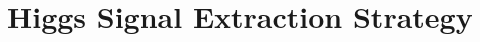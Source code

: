 \documentclass{cmspaper}
\begin{document}
\clearpage    
\section{Higgs Signal Extraction Strategy}

\clearpage
\end{document}
